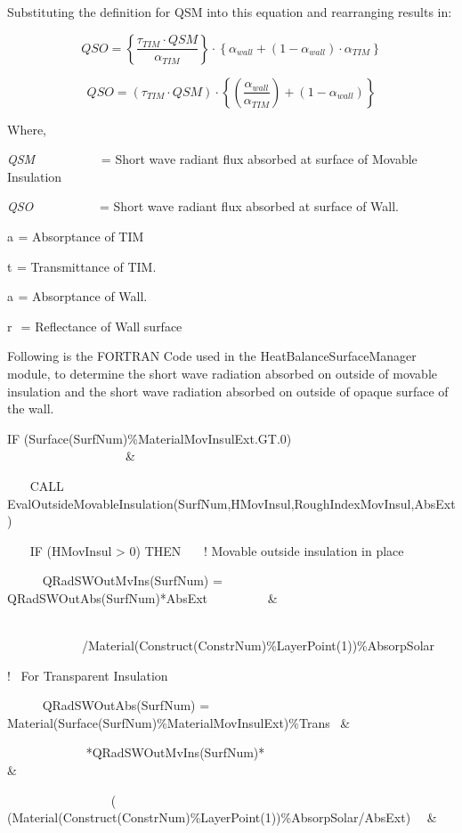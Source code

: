 Substituting the definition for QSM into this equation and rearranging results in:

\begin{equation}
QSO = \left\{ {\frac{{{\tau_{TIM}}\cdot QSM}}{{{\alpha_{TIM}}}}} \right\}\cdot \left\{ {{\alpha_{wall}} + \left( {1 - {\alpha_{wall}}} \right)\cdot {\alpha_{TIM}}} \right\}
\end{equation}

\begin{equation}
QSO = \left( {{\tau_{TIM}}\cdot QSM} \right)\cdot \left\{ {\left( {\frac{{{\alpha_{wall}}}}{{{\alpha_{TIM}}}}} \right) + \left( {1 - {\alpha_{wall}}} \right)} \right\}
\end{equation}

Where,

\emph{QSM}~~~~~~~~~~ = Short wave radiant flux absorbed at surface of Movable Insulation

\emph{QSO}~~~~~~~~~~ = Short wave radiant flux absorbed at surface of Wall.

a\(_{ }\) = Absorptance of TIM

t\(_{ }\) = Transmittance of TIM.

a\(_{ }\) = Absorptance of Wall.

r \(_{ }\) = Reflectance of Wall surface

Following is the FORTRAN Code used in the HeatBalanceSurfaceManager module, to determine the short wave radiation absorbed on outside of movable insulation and the short wave radiation absorbed on outside of opaque surface of the wall.

IF (Surface(SurfNum)\%MaterialMovInsulExt.GT.0)~~~~~~~~~~~~~~~~~ ~~~~~~~~~~~~~~~~~~~\&

~~~ CALL EvalOutsideMovableInsulation(SurfNum,HMovInsul,RoughIndexMovInsul,AbsExt)

~~~ IF (HMovInsul \textgreater{} 0) THEN~~~ ! Movable outside insulation in place

~~~~~ QRadSWOutMvIns(SurfNum) = QRadSWOutAbs(SurfNum)*AbsExt~~~~~~~~~ \&

~~~~~~~~~~ ~~~~~~~~~~~~/Material(Construct(ConstrNum)\%LayerPoint(1))\%AbsorpSolar

!~ For Transparent Insulation

~~~~~ QRadSWOutAbs(SurfNum) = Material(Surface(SurfNum)\%MaterialMovInsulExt)\%Trans~ \&

~~~~~~~~~~~~ *QRadSWOutMvIns(SurfNum)*~~~~~~~~~~~~~~~~~~~~~~~~~~~~~ \&

~~~~~~~~~~~~~~~~ (~ (Material(Construct(ConstrNum)\%LayerPoint(1))\%AbsorpSolar/AbsExt)~~ \&

